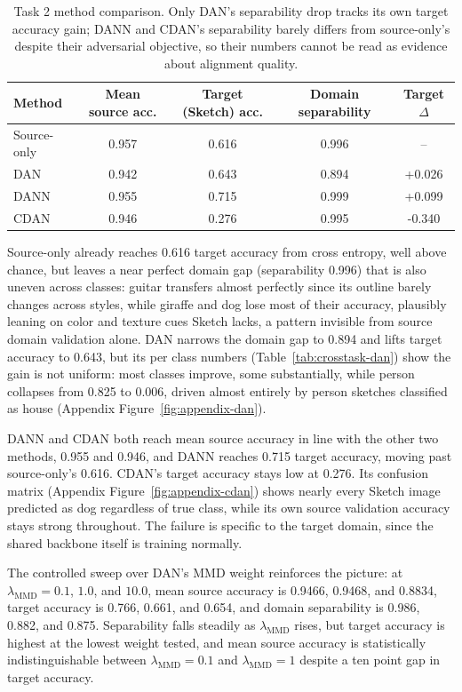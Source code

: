 \documentclass{article}
\begin{document}
\begin{table}[H]
  \centering
  \small
  \begin{tabular}{lcccc}
    \toprule
    Method & Mean source acc. & Target (Sketch) acc. & Domain separability & Target $\Delta$ \\
    \midrule
    Source-only & 0.957 & 0.616 & 0.996 & -- \\
    DAN         & 0.942 & 0.643 & 0.894 & +0.026 \\
    DANN        & 0.955 & 0.715 & 0.999 & +0.099 \\
    CDAN        & 0.946 & 0.276 & 0.995 & -0.340 \\
    \bottomrule
  \end{tabular}
  \vspace{8pt}
  \caption{Task 2 method comparison. Only DAN's separability drop tracks
  its own target accuracy gain; DANN and CDAN's separability barely
  differs from source-only's despite their adversarial objective, so
  their numbers cannot be read as evidence about alignment quality.}
  \label{tab:task2-main}
\end{table}

Source-only already reaches 0.616 target accuracy from cross entropy,
well above chance, but leaves a near perfect domain
gap (separability 0.996) that is also uneven across classes: guitar
transfers almost perfectly since its outline barely changes across
styles, while giraffe and dog lose most of their accuracy, plausibly
leaning on color and texture cues Sketch lacks, a pattern invisible from
source domain validation alone. DAN narrows the domain gap to 0.894 and
lifts target accuracy to 0.643, but its per class numbers
(Table~\ref{tab:crosstask-dan})
show the gain is not uniform: most classes improve, some substantially,
while person collapses from 0.825 to 0.006, driven almost entirely by
person sketches classified as house (Appendix
Figure~\ref{fig:appendix-dan}).

DANN and CDAN both reach mean source accuracy in line with the other two
methods, 0.955 and 0.946, and DANN reaches 0.715 target accuracy, moving
past source-only's 0.616. CDAN's target accuracy stays low at 0.276. Its
confusion matrix (Appendix Figure~\ref{fig:appendix-cdan}) shows nearly
every Sketch image predicted as dog regardless of true class, while its
own source validation accuracy stays strong throughout. The failure is
specific to the target domain, since the shared backbone itself is
training normally.

The controlled sweep over DAN's MMD weight reinforces the picture: at
$\lambda_{\text{MMD}}=0.1$, $1.0$, and
$10.0$, mean source
accuracy is 0.9466, 0.9468, and 0.8834, target accuracy is 0.766, 0.661,
and 0.654, and domain separability is 0.986, 0.882, and 0.875. Separability
falls steadily as $\lambda_{\text{MMD}}$ rises, but target accuracy is
highest at the lowest weight tested, and mean source accuracy is
statistically indistinguishable between $\lambda_{\text{MMD}}=0.1$ and
$\lambda_{\text{MMD}}=1$ despite a ten point gap in target accuracy.
\end{document}
